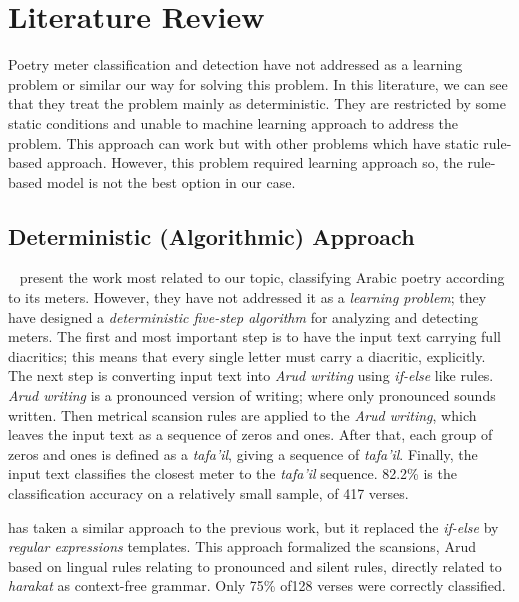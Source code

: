 \chapter{Literature Review}\label{Ch:Literature}
Poetry meter classification and detection have not addressed as a learning problem or similar our way for solving this problem. In this literature, we can see that they treat the problem mainly as deterministic. They are restricted by some static conditions and {\color{red}unable to machine learning approach to address the problem. This approach can work but with other problems which have static rule-based approach. However, this problem required learning approach so, the rule-based model is not the best option in our case. }



\section{Deterministic (Algorithmic) Approach}\label{sec:Determ_Algor_Appr}

~\cite{Abuata2016RuleBasedAlgorithm} present the work most related to our topic, classifying Arabic poetry according to its meters. However, they have not addressed it as a \textit{learning problem}; they have designed a \textit{deterministic five-step algorithm} for analyzing and detecting meters. The first and most important step is to have the input text carrying full diacritics; this means that every single letter must carry a diacritic, explicitly. The next step is converting input text into \textit{Arud writing} using \textit{if-else} like rules. \textit{Arud writing} is a pronounced version of writing; where only pronounced sounds written. Then metrical scansion rules are applied to the \textit{Arud writing}, which leaves the input text as a sequence of zeros and ones. After that, each group of zeros and ones is defined as a \textit{tafa'il}, giving a sequence of \textit{tafa'il}. Finally, the input text classifies the closest meter to the \textit{tafa'il} sequence. 82.2\% is the classification accuracy on a relatively small sample, of 417 verses.

\cite{Alnagdawi2013FindingArabicPoemMeter} has taken a similar approach to the previous work, but it replaced the \textit{if-else} by \textit{regular expressions} templates. This approach formalized the scansions, Arud based on lingual rules relating to pronounced and silent rules, directly related to \textit{harakat} as context-free grammar. Only 75\% of128 verses were correctly classified. 


